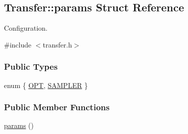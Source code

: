 \hypertarget{structTransfer_1_1params}{\subsection{\-Transfer\-:\-:params \-Struct \-Reference}
\label{structTransfer_1_1params}
}


\-Configuration.  




{\ttfamily \#include $<$transfer.\-h$>$}

\subsubsection*{\-Public \-Types}
\begin{DoxyCompactItemize}
\item 
enum \{ \hyperlink{structTransfer_1_1params_a09e9fec3dc4c28baa7b2355048174352a005ebfa1cc43912dbb95b35f25132eef}{\-O\-P\-T}, 
\hyperlink{structTransfer_1_1params_a09e9fec3dc4c28baa7b2355048174352a96a7d05eaafbf65e2a68d4b47440007d}{\-S\-A\-M\-P\-L\-E\-R}
 \}
\end{DoxyCompactItemize}
\subsubsection*{\-Public \-Member \-Functions}
\begin{DoxyCompactItemize}
\item 
\hyperlink{structTransfer_1_1params_a80b7ebf802c37051334bcb4b6bf85b24}{params} ()
\end{DoxyCompactItemize}
